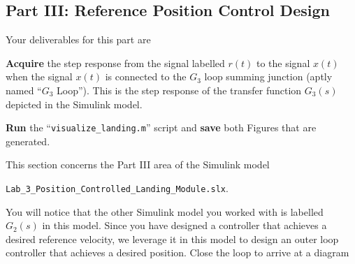 \subsection{Part III: Reference Position Control Design}\label{Lab:3:Part:III}
Your deliverables for this part are
%
\begin{deliverable}[label={del:lab3:g3:1}]
   \textbf{Acquire} the step response from the signal labelled \(r(t)\) to the signal \(x(t)\) when the signal \(x(t)\) is connected to the \(G_3\) loop summing junction (aptly named ``\(G_3\) Loop'').
   This is the step response of the transfer function \(G_3(s)\) depicted in the Simulink model.
\end{deliverable}
%
\begin{deliverable}[label={del:lab3:g3:2}]
   \textbf{Run} the ``\texttt{visualize\_landing.m}'' script and \textbf{save} both Figures that are generated.
\end{deliverable}
%
This section concerns the Part III area of the Simulink model
\begin{center}
  \texttt{Lab\_3\_Position\_Controlled\_Landing\_Module.slx}.
\end{center}
You will notice that the other Simulink model you worked with is labelled \(G_2(s)\) in this model.
Since you have designed a controller that achieves a desired reference velocity, we leverage it in this model to design an outer loop controller that achieves a desired position.
Close the loop to arrive at a diagram
%
\begin{center}
\end{center}
